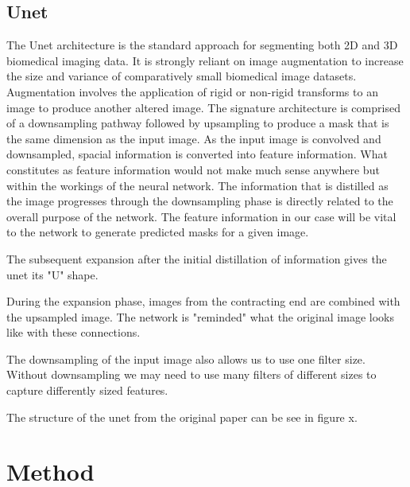 \documentclass[12pt]{article}
\begin{document}
\subsection{Unet}
The Unet architecture is the standard approach for segmenting both 2D and 3D biomedical imaging data.
It is strongly reliant on image augmentation to increase the size and variance of comparatively small biomedical image datasets.
Augmentation involves the application of rigid or non-rigid transforms to an image to produce another altered image.
The signature architecture is comprised of a downsampling pathway followed by upsampling to produce a mask that is the same dimension as the input image.
As the input image is convolved and downsampled, spacial information is converted into feature information.
What constitutes as feature information would not make much sense anywhere but within the workings of the neural network.
The information that is distilled as the image progresses through the downsampling phase is directly related to the overall purpose of the network. 
The feature information in our case will be vital to the network to generate predicted masks for a given image.

The subsequent expansion after the initial distillation of information gives the unet its "U" shape.

During the expansion phase, images from the contracting end are combined with the upsampled image.
The network is "reminded" what the original image looks like with these connections.

The downsampling of the input image also allows us to use one filter size.
Without downsampling we may need to use many filters of different sizes to capture differently sized features.

The structure of the unet from the original paper can be see in figure x.

\section{Method}
\end{document}
